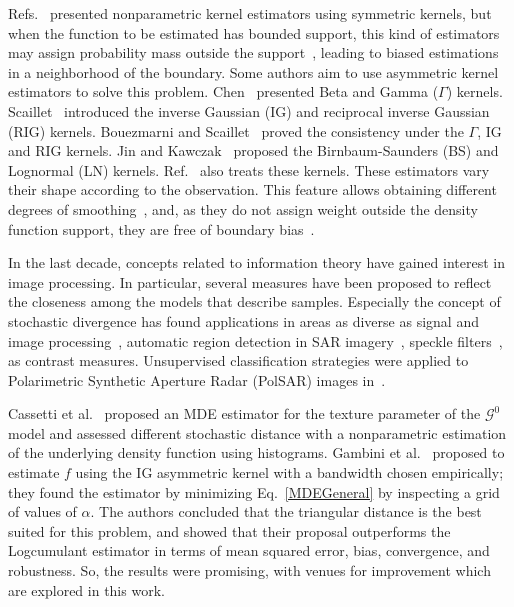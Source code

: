 \documentclass[twocolumn]{svjour3}
\begin{document}
Refs.~\cite{Parzen62,Roseanblatt56} presented nonparametric kernel estimators using symmetric kernels, but when the function to be estimated has bounded support, this kind of estimators may assign probability mass outside the support~\cite{Silverman1986}, leading to biased estimations in a neighborhood of the boundary.
Some authors aim to use asymmetric kernel estimators to solve this problem. 
Chen~\cite{chen1999,chensx2000} presented Beta and Gamma ($\Gamma$) kernels.
Scaillet~\cite{Scaillet2004} introduced the inverse Gaussian (IG) and reciprocal inverse Gaussian (RIG) kernels.
Bouezmarni and Scaillet~\cite{bouezmarni2005} proved the consistency under the $\Gamma$, IG and RIG kernels. 
Jin and Kawczak~\cite{Jin2003} proposed the Birnbaum-Saunders (BS) and Lognormal (LN) kernels. 
Ref.~\cite{libengue2013} also treats these kernels. 
These estimators vary their shape according to the observation. This feature allows obtaining different degrees of smoothing~\cite{Scaillet2004}, and, as they do not assign weight outside the density function support, they are free of boundary bias~\cite{chensx2000}.

In the last decade, concepts related to information theory have gained interest in image processing. 
In particular, several measures have been proposed to reflect the closeness among the models that describe samples. 
Especially the concept of stochastic divergence has found applications in areas as diverse as signal and image processing~\cite{Aviyente2007}, automatic region detection in SAR imagery~\cite{SilvaCribariFrery:ImprovedLikelihood:Environmetrics,Nascimento2009}, 
speckle filters~\cite{Penna2019}, as contrast measures. 
Unsupervised classification strategies were applied to Polarimetric Synthetic Aperture Radar (PolSAR) images in~\cite{Carvalho2019}.

Cassetti et al.~\cite{APSAR2013ParameterEstimationStochasticDistances} proposed an MDE estimator for the texture parameter of the $\mathcal{G}^0$ model and assessed different stochastic distance with a nonparametric estimation of the underlying density function using histograms. 
Gambini et al.~\cite{gambini2015} proposed to estimate $f$ using the IG asymmetric kernel with a bandwidth chosen empirically; 
they found the estimator by minimizing Eq.~\eqref{MDEGeneral} by inspecting a grid of values of $\alpha$. 
The authors concluded that the triangular distance is the best suited for this problem, and showed that their proposal outperforms the Logcumulant estimator in terms of mean squared error, bias, convergence, and robustness. 
So, the results were promising, with venues for improvement which are explored in this work.
\end{document}
